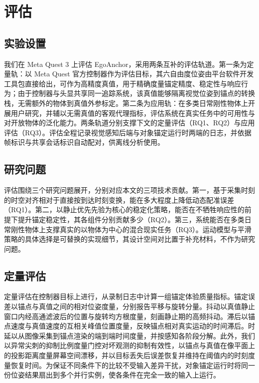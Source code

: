 \documentclass[review]{vgtc}
\begin{document}
\section{评估}\label{sec:eval}


\subsection{实验设置}


我们在 Meta Quest 3 上评估 EgoAnchor，采用两条互补的评估轨道。第一条为定量轨：以 Meta Quest 官方控制器作为评估目标，其六自由度位姿由平台软件开发工具包直接给出，可作为高精度真值，用于精确度量锚定精度、稳定性与响应行为；由于控制器与头显共享同一追踪系统，该真值能够隔离视觉位姿到锚点的转换栈，无需额外的物体到真值外参标定。第二条为应用轨：在多类日常刚性物体上开展用户研究，并辅以无需真值的客观代理指标，评估系统在真实任务中的可用性与对开放物体的泛化能力。两条轨道分别支撑下文的定量评估（RQ1、RQ2）与应用评估（RQ3）。评估全程记录视觉感知后端与对象锚定运行时两端的日志，并依据帧标识与共享会话标识自动配对，供离线分析使用。

\subsection{研究问题}


评估围绕三个研究问题展开，分别对应本文的三项技术贡献。第一，基于采集时刻的时空对齐相对于直接按到达时刻变换，能在多大程度上降低动态配准误差（RQ1）。第二，以静止优先先验为核心的稳定化策略，能否在不牺牲响应性的前提下提升锚定稳定性，其各组件分别贡献多少（RQ2）。第三，系统能否在多类日常刚性物体上支撑真实的以物体为中心的混合现实任务（RQ3）。运动模型与平滑策略的具体选择是可替换的实现细节，其设计空间对比置于补充材料，不作为研究问题。

\subsection{定量评估}


定量评估在控制器目标上进行，从录制日志中计算一组锚定体验质量指标。锚定误差以锚点与真值之间的相对位姿度量，分别报告平移与旋转分量。抖动以真值静止窗口内经高通滤波后的位置与旋转均方根度量，刻画静止期的高频抖动。滞后以锚点速度与真值速度的互相关峰值位置度量，反映锚点相对真实运动的时间滞后。时延以从图像采集到锚点渲染的端到端时间度量，并按感知各阶段分解。此外，我们以异常尖刺的抑制比例度量门控对坏观测的抑制有效性，以锚点与真值在像平面上的投影距离度量屏幕空间漂移，并以目标丢失后误差恢复并维持在阈值内的时刻度量恢复时间。为保证不同条件下的比较不受输入差异干扰，对象锚定运行时将同一份位姿结果扇出到多个并行实例，使各条件在完全一致的输入上运行。
\end{document}
